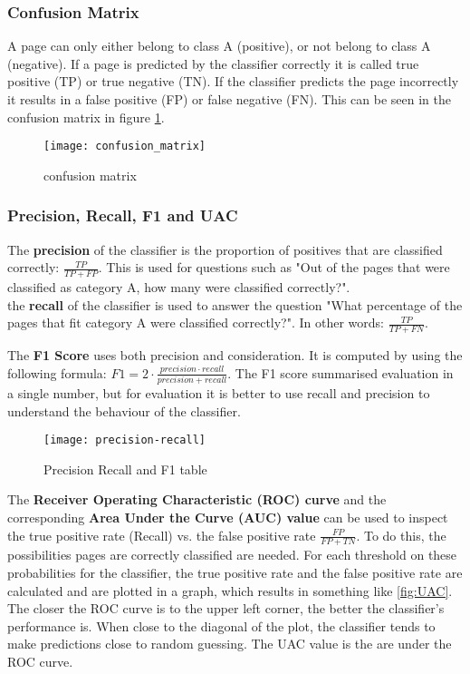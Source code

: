 \subsubsection{Confusion Matrix}
A page can only either belong to class A (positive), or not belong to class A (negative). If a page is predicted by the classifier correctly it is called true positive (TP) or true negative (TN). If the classifier predicts the page incorrectly it results in a false positive (FP) or false negative (FN). This can be seen in the confusion matrix in figure \ref{fig:confusion_matrix}. 

\begin{figure}[ht]
\centering
\texttt{[image: confusion\_matrix]}
\caption{confusion matrix \protect\footnotemark{}}
\label{fig:confusion_matrix}
\end{figure}


\subsubsection{Precision, Recall, F1 and UAC}\label{sec:classification-validation}
The \textbf{precision} of the classifier is the proportion of positives that are classified correctly: $\frac{TP}{TP+FP}$. This is used for questions such as "Out of the pages that were classified as category A, how many were classified correctly?".\\

the \textbf{recall} of the classifier is used to answer the question "What percentage of the pages that fit category A were classified correctly?". In other words: $\frac{TP}{TP+FN}$.

The \textbf{F1 Score} uses both precision and consideration. It is computed by using the following formula: $F1 = 2\cdot \frac{precision \cdot recall}{precision + recall}$. The F1 score summarised evaluation in a single number, but for evaluation it is better to use recall and precision to understand the behaviour of the classifier. \\

\begin{figure}[ht]
\centering
\texttt{[image: precision-recall]}
\caption{Precision Recall and F1 table}
\label{fig:prec-rec}
\end{figure}

The \textbf{Receiver Operating Characteristic (ROC) curve} and the corresponding \textbf{Area Under the Curve (AUC) value} can be used to inspect the true positive rate (Recall) vs. the false positive rate $\frac{FP}{FP + TN}$. To do this, the possibilities pages are correctly classified are needed. For each threshold on these probabilities for the classifier, the true positive rate and the false positive rate are calculated and are plotted in a graph, which results in something like \ref{fig:UAC}. The closer the ROC curve is to the upper left corner, the better the classifier's performance is. When close to the diagonal of the plot, the classifier tends to make predictions close to random guessing. The UAC value is the are under the ROC curve.

